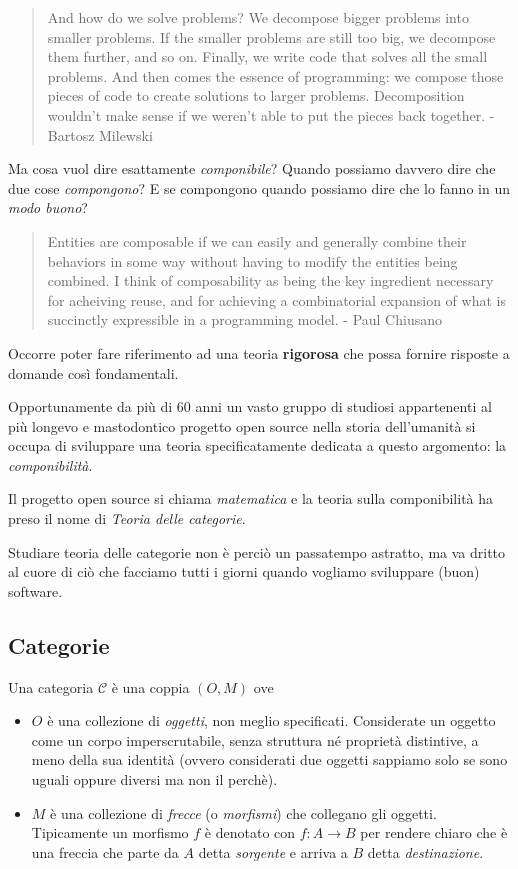 \documentclass[12pt]{article}
\begin{document}
\begin{quote}
And how do we solve problems? We decompose bigger problems into smaller problems. If the smaller problems are still too big,
we decompose them further, and so on. Finally, we write code that solves all the small problems.
And then comes the essence of programming: we compose those pieces of code to create solutions to larger problems.
Decomposition wouldn’t make sense if we weren’t able to put the pieces back together. - Bartosz Milewski
\end{quote}

Ma cosa vuol dire esattamente \emph{componibile}? Quando possiamo davvero dire che due cose \emph{compongono}?
E se compongono quando possiamo dire che lo fanno in un \emph{modo buono}?\\

\begin{quote}
Entities are composable if we can easily and generally combine their behaviors in some way without having to modify the entities being combined.
I think of composability as being the key ingredient necessary for acheiving reuse, and for achieving a combinatorial expansion of
what is succinctly expressible in a programming model. - Paul Chiusano
\end{quote}

Occorre poter fare riferimento ad una teoria \textbf{rigorosa} che possa fornire risposte a domande così fondamentali.

Opportunamente da più di 60 anni un vasto gruppo di studiosi appartenenti al più longevo e mastodontico progetto open source nella storia
dell'umanità si occupa di sviluppare una teoria specificatamente dedicata a questo argomento: la \emph{componibilità}.

Il progetto open source si chiama \emph{matematica} e la teoria sulla componibilità ha preso il nome di \emph{Teoria delle categorie}.

Studiare teoria delle categorie non è perciò un passatempo astratto, ma va dritto al cuore di ciò che facciamo tutti i giorni quando vogliamo
sviluppare (buon) software.

\subsection{Categorie}

Una categoria $\mathcal{C}$ è una coppia $(O, M)$ ove
\begin{itemize}
  \item $O$ è una collezione di \emph{oggetti}, non meglio specificati. Considerate un oggetto come un corpo imperscrutabile,
  senza struttura né proprietà distintive, a meno della sua identità (ovvero considerati due oggetti sappiamo solo se sono uguali oppure diversi
  ma non il perchè).
  \item $M$ è una collezione di \emph{frecce} (o \emph{morfismi}) che collegano gli oggetti. Tipicamente un morfismo $f$ è denotato con $f: A \rightarrow B$
  per rendere chiaro che è una freccia che parte da $A$ detta \emph{sorgente} e arriva a $B$ detta \emph{destinazione}.
\end{itemize}
\end{document}
